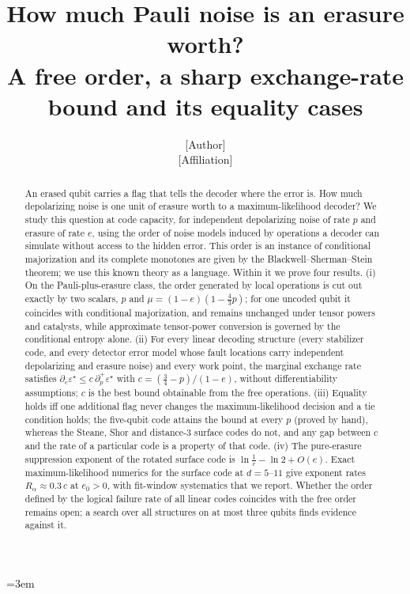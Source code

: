 \documentclass[11pt,a4paper]{article}
\title{How much Pauli noise is an erasure worth?\\[2pt]
\large A free order, a sharp exchange-rate bound and its equality cases}
\author{[Author]\\{\small [Affiliation]}}
\date{}
\theoremstyle{plain}
\theoremstyle{definition}
\theoremstyle{remark}
\newcommand{\err}{\varepsilon^{\star}}
\begin{document}
\emergencystretch=3em
\maketitle

\begin{abstract}\noindent
An erased qubit carries a flag that tells the decoder where the error is. How much depolarizing noise is one unit of erasure worth to a maximum-likelihood decoder? We study this question at code capacity, for independent depolarizing noise of rate $p$ and erasure of rate $e$, using the order of noise models induced by operations a decoder can simulate without access to the hidden error. This order is an instance of conditional majorization and its complete monotones are given by the Blackwell--Sherman--Stein theorem; we use this known theory as a language. Within it we prove four results. (i) On the Pauli-plus-erasure class, the order generated by local operations is cut out exactly by two scalars, $p$ and $\mu=(1-e)(1-\tfrac43p)$; for one uncoded qubit it coincides with conditional majorization, and remains unchanged under tensor powers and catalysts, while approximate tensor-power conversion is governed by the conditional entropy alone. (ii) For every linear decoding structure (every stabilizer code, and every detector error model whose fault locations carry independent depolarizing and erasure noise) and every work point, the marginal exchange rate satisfies $\partial_e\err\le c\,\partial_p^+\err$ with $c=(\tfrac34-p)/(1-e)$, without differentiability assumptions; $c$ is the best bound obtainable from the free operations. (iii) Equality holds iff one additional flag never changes the maximum-likelihood decision and a tie condition holds; the five-qubit code attains the bound at every $p$ (proved by hand), whereas the Steane, Shor and distance-3 surface codes do not, and any gap between $c$ and the rate of a particular code is a property of that code. (iv) The pure-erasure suppression exponent of the rotated surface code is $\ln\frac1e-\ln2+O(e)$. Exact maximum-likelihood numerics for the surface code at $d=5$--$11$ give exponent rates $R_\alpha\approx0.3\,c$ at $e_0>0$, with fit-window systematics that we report. Whether the order defined by the logical failure rate of all linear codes coincides with the free order remains open; a search over all structures on at most three qubits finds evidence against it.
\end{abstract}

\tableofcontents
\end{document}
